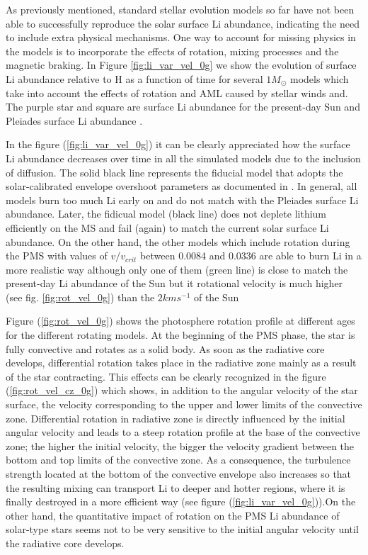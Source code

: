 \documentclass[fleqn,usenatbib]{mnras}
\begin{document}
As previously mentioned, standard stellar evolution models so far have not been able to successfully reproduce the solar surface Li abundance, indicating the need to include extra physical mechanisms. One way to account for missing physics in the models is to incorporate the effects of rotation, mixing processes and the magnetic braking. In Figure \ref{fig:li_var_vel_0g} we show the evolution of surface Li abundance relative to H as a function of time for several $1M_{\odot}$ models which take into account the effects of rotation and AML caused by stellar winds and. The purple star and square are surface Li abundance for the present-day Sun \citet{Asplund2009} and Pleiades surface Li abundance \citep{Sestito2005}.\par

In the figure (\ref{fig:li_var_vel_0g}) it can be clearly appreciated how the surface Li abundance decreases over time in all the simulated models due to the inclusion of diffusion. The solid black line represents the fiducial model that adopts the solar-calibrated envelope overshoot parameters as documented in \citet{Choi2016}. In general, all models burn too much Li early on and do not match with the Pleiades surface Li abundance. Later, the fidicual model (black line) does not deplete lithium efficiently on the MS and fail (again) to match the current solar surface Li abundance. On the other hand, the other models which include rotation during the PMS with values of $v/v_{crit}$ between 0.0084 and 0.0336 are able to burn Li in a more realistic way although only one of them (green line) is close to match the present-day Li abundance of the Sun but it rotational velocity is much higher (see fig. \ref{fig:rot_vel_0g}) than the $2 kms^{-1}$ of the Sun \citep{Gill2012} \par

Figure (\ref{fig:rot_vel_0g}) shows the photosphere rotation profile at different ages for the different rotating models. At the beginning of the PMS phase, the star is fully convective and rotates as a solid body. As soon as the radiative core develops, differential rotation takes place in the radiative zone mainly as a result of the star contracting. This effects can be clearly recognized in the figure (\ref{fig:rot_vel_cz_0g}) which shows, in addition to the angular velocity of the star surface, the velocity corresponding to the upper and lower limits of the convective zone. Differential rotation in radiative zone is directly influenced by the initial angular velocity and leads to a steep rotation profile at the base of the convective zone; the higher the initial velocity, the bigger the velocity gradient between the bottom and top limits of the convective zone. As a consequence, the turbulence strength located at the bottom of the convective envelope also increases so that the resulting mixing can transport Li to deeper and hotter regions, where it is finally destroyed in a more efficient way (see figure (\ref{fig:li_var_vel_0g})).On the other hand, the quantitative impact of rotation on the PMS Li abundance of solar-type stars seems not to be very sensitive to the initial angular velocity until the radiative core develops.\par
\end{document}
